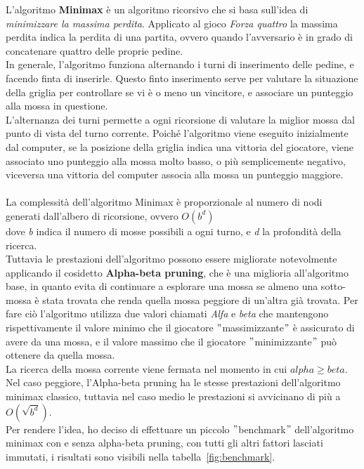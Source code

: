 L'algoritmo \textbf{Minimax} è un algoritmo ricorsivo che si basa sull'idea di \textit{minimizzare la massima perdita}.
Applicato al gioco \textit{Forza quattro} la massima perdita indica la perdita di una partita, ovvero quando
l'avversario è in grado di concatenare quattro delle proprie pedine. \\
In generale, l'algoritmo funziona alternando i turni di inserimento delle pedine, e facendo finta di inserirle.
Questo finto inserimento serve per valutare la situazione della griglia per controllare se vi è o meno un vincitore, e
associare un punteggio alla mossa in questione. \\
L'alternanza dei turni permette a ogni ricorsione di valutare la miglior mossa dal punto di vista del turno corrente.
Poiché l'algoritmo viene eseguito inizialmente dal computer, se la posizione della griglia indica una vittoria
del giocatore, viene associato uno punteggio alla mossa molto basso, o più semplicemente negativo, viceversa una
vittoria del computer associa alla mossa un punteggio maggiore. \\
\\
La complessità dell'algoritmo Minimax è proporzionale al numero di nodi generati dall'albero di ricorsione, ovvero $O(b^d)$ \\
dove \textit{b} indica il numero di mosse possibili a ogni turno, e \textit{d} la profondità della ricerca. \\
Tuttavia le prestazioni dell'algoritmo possono essere migliorate notevolmente applicando il cosidetto
\textbf{Alpha-beta pruning}, che è una miglioria all'algoritmo base, in quanto evita di continuare a esplorare una
mossa se almeno una sotto-mossa è stata trovata che renda quella mossa peggiore di un'altra già trovata.
Per fare ciò l'algoritmo utilizza due valori chiamati \textit{Alfa} e \textit{beta} che mantengono rispettivamente
il valore minimo che il giocatore \("\)massimizzante\("\) è assicurato di avere da una mossa, e il valore massimo che
il giocatore \("\)minimizzante\("\) può ottenere da quella mossa. \\
La ricerca della mossa corrente viene fermata nel momento in cui $alpha \geq beta$. \\
Nel caso peggiore, l'Alpha-beta pruning ha le stesse prestazioni dell'algoritmo minimax classico, tuttavia nel caso
medio le prestazioni si avvicinano di più a $O(\sqrt {b^d})$. \\
Per rendere l'idea, ho deciso di effettuare un piccolo \("\)benchmark\("\) dell'algoritmo minimax con e senza
alpha-beta pruning, con tutti gli altri fattori lasciati immutati, i risultati sono visibili nella tabella~\ref{fig:benchmark}.

